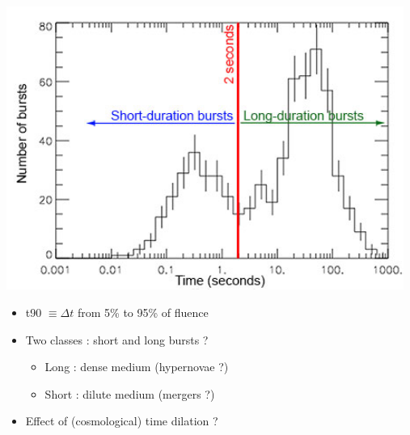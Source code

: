 \Tr
{}%
\vspace*{0.5cm}
%
\begin{center}
\includegraphics[keepaspectratio,width=13cm]{GRB-T90}
\end{center}

\newpage

\vspace*{1cm}
%
\begin{itemize}
\item t90 $\equiv \Delta t$ from 5\% to 95\% of fluence
\item Two classes : short and long bursts ?
\begin{itemize}
\item Long : dense medium (hypernovae ?)
\item Short : dilute medium (mergers ?)
\end{itemize}
\item[] {\blue Effect of (cosmological) time dilation ?}
\end{itemize}

